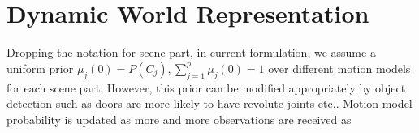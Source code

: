 \documentclass[10pt,twocolumn,letterpaper]{article}
\begin{document}
\section{Dynamic World Representation} 
% 
% 
% 
Dropping the notation for scene part, in current formulation, we assume a uniform prior $\mu_j(0) = P(C_j), \sum_{j=1}^{p}\mu_j(0) = 1$ over different motion models for each scene part. However, this prior can be modified appropriately by object detection such as doors are more likely to have revolute joints etc.. Motion model probability is updated as more and more observations are received \cite{yaakov2001estimation} as 
\end{document}
